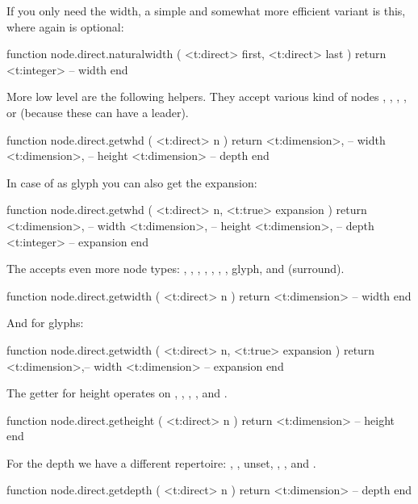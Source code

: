 If you only need the width, a simple and somewhat more efficient variant is this,
where again  is optional:

\starttyping[option=LUA]
function node.direct.naturalwidth (
    <t:direct> first,
    <t:direct> last
)
    return <t:integer> -- width
end
\stoptyping

More low level are the following helpers. They accept various kind of nodes
, , , ,  or 
(because these can have a leader).

\starttyping[option=LUA]
function node.direct.getwhd ( <t:direct> n )
    return
        <t:dimension>, -- width
        <t:dimension>, -- height
        <t:dimension>  -- depth
end
\stoptyping

In case of as glyph you can also get the expansion:

\starttyping[option=LUA]
function node.direct.getwhd ( <t:direct> n, <t:true> expansion )
    return
        <t:dimension>, -- width
        <t:dimension>, -- height
        <t:dimension>, -- depth
        <t:integer>    -- expansion
end
\stoptyping

The  accepts even more node types: , ,
, , , , , \type
{glyph},  and  (surround).

\starttyping[option=LUA]
function node.direct.getwidth ( <t:direct> n )
    return <t:dimension> -- width
end
\stoptyping

And for glyphs:

\starttyping[option=LUA]
function node.direct.getwidth ( <t:direct> n, <t:true> expansion )
    return
        <t:dimension>,-- width
        <t:dimension> -- expansion
end
\stoptyping

The getter for height operates on , , ,
,  and .

\starttyping[option=LUA]
function node.direct.getheight ( <t:direct> n )
    return <t:dimension> -- height
end
\stoptyping

For the depth we have a different repertoire: , , \type
{unset}, , ,  and .

\starttyping[option=LUA]
function node.direct.getdepth ( <t:direct> n )
    return <t:dimension> -- depth
end
\stoptyping

